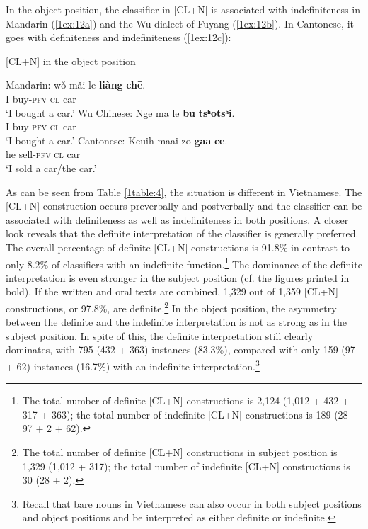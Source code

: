 \documentclass[output=paper]{langsci/langscibook}
\begin{document}
In the object position, the classifier in [CL+N] is associated with indefiniteness in Mandarin (\ref{1ex:12a}) and the Wu dialect of Fuyang (\ref{1ex:12b}). In Cantonese, it goes with definiteness and indefiniteness (\ref{1ex:12c}):

\begin{exe}
\ex\label{1ex:12}
[CL+N] in the object position \citep[][338-339]{li:bisang:12}
\begin{xlista}
	\ex\label{1ex:12a}
	Mandarin:
	\exi{}
	\gll wǒ  mǎi-le       {\textbf{liàng}}  {\textbf{chē}}. \\
	     I      buy-{\textsc{pfv}}  {\textsc{cl}}     car \\
	\glt `I bought a car.'
	\ex\label{1ex:12b}
	Wu Chinese:
	\exi{}
	\gll Nge   ma   le      {\textbf{bu}}    {\textbf{tsʰotsʰi}}. \\
	     I        buy  {\textsc{pfv}}  {\textsc{cl}}   car \\
	\glt `I bought a car.'
	\ex\label{1ex:12c}
	Cantonese:
	\exi{}
	\gll Keuih   maai-zo    {\textbf{gaa}}  {\textbf{ce}}. \\
	     he         sell-{\textsc{pfv}}   {\textsc{cl}}   car \\
	\glt `I sold a car/the car.'
	\end{xlista}
\end{exe}

\largerpage
As can be seen from Table \ref{1table:4}, the situation is different in Vietnamese. The [CL+N] construction occurs preverbally and postverbally and the classifier can be associated with definiteness as well as indefiniteness in both positions. A closer look reveals that the definite interpretation of the classifier is generally preferred. The overall percentage of definite [CL+N] constructions is 91.8\% in contrast to only 8.2\% of classifiers with an indefinite function.\footnote{The total number of definite [CL+N] constructions is 2,124 (1,012 + 432 + 317 + 363); the total number of indefinite [CL+N] constructions is 189 (28 + 97 + 2 + 62).} The dominance of the definite interpretation is even stronger in the subject position (cf. the figures printed in bold). If the written and oral texts are combined, 1,329 out of 1,359 [CL+N] constructions, or 97.8\%, are definite.\footnote{The total number of definite [CL+N] constructions in subject position is 1,329 (1,012 + 317); the total number of indefinite [CL+N] constructions is 30 (28 + 2).} In the object position, the asymmetry between the definite and the indefinite interpretation is not as strong as in the subject position. In spite of this, the definite interpretation still clearly dominates, with 795 (432 + 363) instances 
(83.3\%), compared with only 159 (97 + 62) instances (16.7\%) with an indefinite interpretation.\footnote{Recall that bare nouns in Vietnamese can also occur in both subject positions and object positions and be interpreted as either definite or indefinite.}
\end{document}
